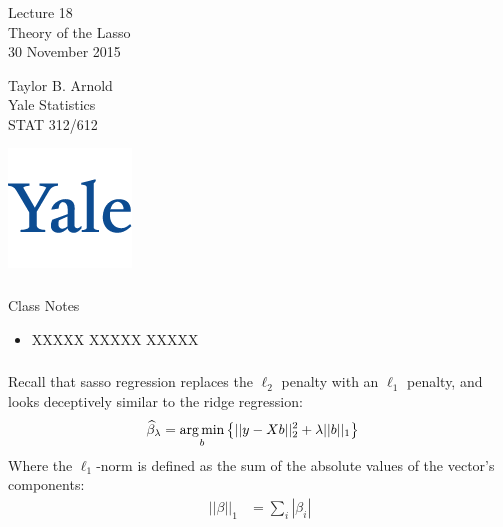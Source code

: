 



\begin{frame}[fragile] \frametitle{}

\vfill

{\fontsize{0.7cm}{0cm}\selectfont Lecture 18 \\\vspace{0.2cm}
Theory of the Lasso}\\\vspace{0.5cm}
30 November 2015

\vspace{2cm}

\begin{minipage}{0.6\textwidth}
Taylor B. Arnold \\
Yale Statistics \\
STAT 312/612
\end{minipage}
\hfill
\begin{minipage}{0.3\textwidth}\raggedleft
\includegraphics[scale=0.3]{../yale-logo.png}
\end{minipage}%

\end{frame}

\begin{frame}[fragile] \frametitle{}

{\color{yaleblue}\fontsize{16pt}{20pt}\selectfont Class Notes}

\begin{itemize}
\item XXXXX XXXXX XXXXX
\end{itemize}

\end{frame}

\begin{frame}[fragile] \frametitle{}

Recall that sasso regression replaces the $\ell_2$ penalty with an $\ell_1$ penalty,
and looks deceptively similar to the ridge regression:
\begin{align*}
\widehat{\beta}_\lambda &= \mathop{\mathrm{arg\,min}}_b \left\{ || y - Xb ||_2^2 + \lambda ||b||_1 \right\}
\end{align*}
Where the $\ell_1$-norm is defined as the sum of the absolute values of the
vector's components:
\begin{align*}
|| \beta ||_1 &= \sum_i | \beta_i |
\end{align*}

\end{frame}

